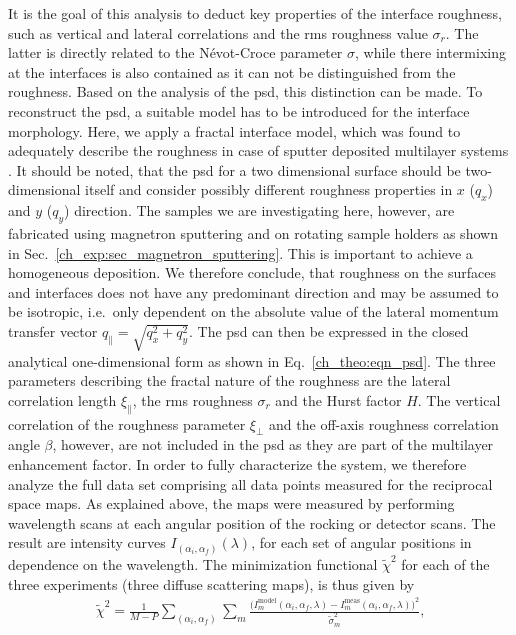 It is the goal of this analysis to deduct key properties of the interface roughness, such as vertical and lateral correlations and the \gls{rms} roughness value $\sigma_r$. The latter is directly related to the N\'{e}vot-Croce parameter $\sigma$, while there intermixing at the interfaces is also contained as it can not be distinguished from the roughness. Based on the analysis of the \gls{psd}, this distinction can be made. To reconstruct the \gls{psd}, a suitable model has to be introduced for the interface morphology. Here, we apply a fractal interface model, which was found to adequately describe the roughness in case of sputter deposited multilayer systems \cite{de_boer_x-ray_1995, de_boer_x-ray_1996, sinha_x-ray_1988}. It should be noted, that the \gls{psd} for a two dimensional surface should be two-dimensional itself and consider possibly different roughness properties in $x$ ($q_x$) and $y$ ($q_y$) direction. The samples we are investigating here, however, are fabricated using magnetron sputtering and on rotating sample holders as shown in Sec.~\ref{ch_exp:sec_magnetron_sputtering}. This is important to achieve a homogeneous deposition. We therefore conclude, that roughness on the surfaces and interfaces does not have any predominant direction and may be assumed to be isotropic, i.e.~only dependent on the absolute value of the lateral momentum transfer vector $q_\parallel = \sqrt{q_x^2+q_y^2}$. The \gls{psd} can then be expressed in the closed analytical one-dimensional form as shown in Eq.~\eqref{ch_theo:eqn_psd}. The three parameters describing the fractal nature of the roughness are the lateral correlation length $\xi_\parallel$, the \gls{rms} roughness $\sigma_r$ and the Hurst factor $H$. The vertical correlation of the roughness parameter $\xi_\perp$ and the off-axis roughness correlation angle $\beta$, however, are not included in the \gls{psd} as they are part of the multilayer enhancement factor. In order to fully characterize the system, we therefore analyze the full data set comprising all data points measured for the reciprocal space maps. As explained above, the maps were measured by performing wavelength scans at each angular position of the rocking or detector scans. The result are intensity curves $I_{(\alpha_i, \alpha_f)}(\lambda)$, for each set of angular positions in dependence on the wavelength. The minimization functional $\tilde{\chi}^2$ for each of the three experiments (three diffuse scattering maps), is thus given by
\begin{align}
 \tilde{\chi}^2 = \frac{1}{M-P} \sum\limits_{(\alpha_i, \alpha_f)} \sum\limits_{m} \frac{\big(I_m^\text{model}(\alpha_i, \alpha_f, \lambda)
- I_m^\text{meas}(\alpha_i, \alpha_f, \lambda)\big)^2}{\tilde{\sigma}_m^2} \text{,} \label{ch_diff:eqn_chi_diffuse}
\end{align}
